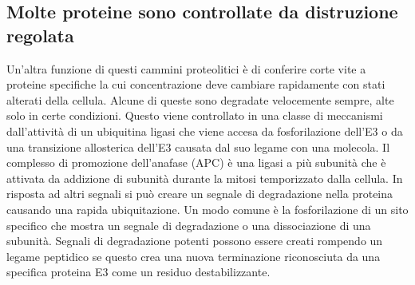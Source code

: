 \subsection{Molte proteine sono controllate da distruzione regolata}
Un'altra funzione di questi cammini proteolitici \`e di conferire corte vite a proteine specifiche la cui concentrazione deve cambiare rapidamente con stati alterati della cellula. 
Alcune di queste sono degradate velocemente sempre, alte solo in certe condizioni. Questo viene controllato in una classe di meccanismi dall'attivit\`a di un ubiquitina ligasi che viene
accesa da fosforilazione dell'E3 o da una transizione allosterica dell'E3 causata dal suo legame con una molecola. Il complesso di promozione dell'anafase (APC) \`e una ligasi a pi\`u
subunit\`a che \`e attivata da addizione di subunit\`a durante la mitosi temporizzato dalla cellula. In risposta ad altri segnali si pu\`o creare un segnale di degradazione nella 
proteina causando una rapida ubiquitazione. Un modo comune \`e la fosforilazione di un  sito specifico che mostra un segnale di degradazione o una dissociazione di una subunit\`a. 
Segnali di degradazione potenti possono essere creati rompendo un legame peptidico se questo crea una nuova terminazione  riconosciuta da una specifica proteina E3 come un
residuo destabilizzante. 
